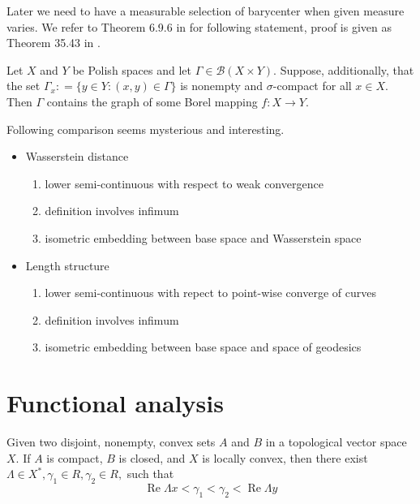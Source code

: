 Later we need to have a measurable selection of barycenter when given measure varies. We refer to Theorem 6.9.6 in \cite{Bogachev2007} for following statement, proof is given as Theorem 35.43 in \cite{kechris1995}.

\begin{thm}
	\label{thm:measurale_selection}
	Let \( X \) and \( Y \) be Polish spaces and let \( \Gamma \in \mathcal { B } ( X \times Y ) \). Suppose, additionally, that the set \( \Gamma _ { x }: = \{ y \in Y: ( x , y ) \in \Gamma \} \) is nonempty and \( \sigma \)-compact for all \( x \in X \). Then \( \Gamma \) contains the graph of some Borel mapping \( f: X \rightarrow Y\).
\end{thm}


\begin{rmk} 
	Following comparison seems mysterious and interesting.
	\begin{itemize}
		\item Wasserstein distance
		      \begin{enumerate}
			      \item lower semi-continuous with respect to weak convergence
			      \item definition involves infimum
			      \item isometric embedding between base space and Wasserstein space
		      \end{enumerate}
		\item Length structure
		      \begin{enumerate}
			      \item lower semi-continuous with repect to point-wise converge of curves
			      \item definition involves infimum
			      \item isometric embedding between base space and space of geodesics
		      \end{enumerate}
	\end{itemize}
\end{rmk}

\section{Functional analysis}

\begin{thm}
	Given two disjoint, nonempty, convex sets $A$ and $B$ in a topological vector space $X$. If \( A \) is compact, \( B \) is closed, and \( X \) is locally convex, then there exist \( \Lambda \in X ^ { * } , \gamma _ { 1 } \in R , \gamma _ { 2 } \in R , \) such that
	\[
		\operatorname { Re } \Lambda x < \gamma _ { 1 } < \gamma _ { 2 } < \operatorname { Re } \Lambda y
	\]
\end{thm}

